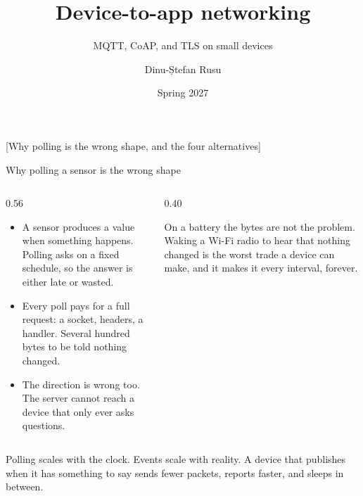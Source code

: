 \documentclass[10pt,aspectratio=169,t]{beamer}
\title{Device-to-app networking}
\subtitle{MQTT, CoAP, and TLS on small devices}
\author{Dinu-Ștefan Rusu}
\institute{FILS, Universitatea Politehnica București}
\date{Spring 2027}
\begin{document}
\titleframe


[Why polling is the wrong shape, and the four alternatives]

\begin{frame}[embedded,eyebrow=Pushing]{Why polling a sensor is the wrong shape}
  \vskip 2mm
  \begin{columns}[T]
    \begin{column}{0.56\textwidth}
      \begin{itemize}
        \item A sensor produces a value when something happens. Polling asks on a fixed schedule, so the answer is either late or wasted.
        \item Every poll pays for a full request: a socket, headers, a handler. Several hundred bytes to be told nothing changed.
        \item The direction is wrong too. The server cannot reach a device that only ever asks questions.
      \end{itemize}
    \end{column}
    \begin{column}{0.40\textwidth}
      \begin{hint}
        On a battery the bytes are not the problem. Waking a Wi-Fi radio to hear that nothing changed is the worst trade a device can make, and it makes it every interval, forever.
      \end{hint}
    \end{column}
  \end{columns}
  \begin{takeaway}{Polling scales with the clock. Events scale with reality.}
    A device that publishes when it has something to say sends fewer packets, reports faster, and sleeps in between.
  \end{takeaway}
\end{frame}
\end{document}

